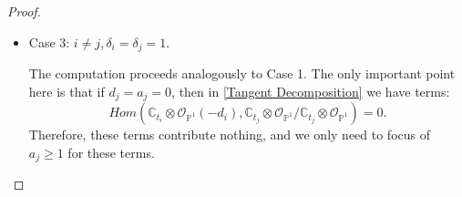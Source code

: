 \documentclass{amsart}
\begin{document}
\begin{proof}
\begin{itemize}
Consider the following short exact sequence: 
    \[0 \to \mathcal{O}_{\mathbb{P}^1}(-d_i) \to  \mathcal{O}_{\mathbb{P}^1} \to \mathcal{O}_{\mathbb{P}^1}/\mathcal{O}_{\mathbb{P}^1}(-d_i) \to 0.\]
    
    Applying the functor $Hom(\mathcal{O}_{\mathbb{P}^1}(-d_i),-)$, we obtain the exact sequence:
    \begin{align*}
   \scalebox{0.9}{$0 \to Hom(\mathcal{O}_{\mathbb{P}^1}(-d_i),\mathcal{O}_{\mathbb{P}^1}(-d_i)) \to  Hom(\mathcal{O}_{\mathbb{P}^1}(-d_i),\mathcal{O}_{\mathbb{P}^1}) \to Hom(\mathcal{O}_{\mathbb{P}^1}(-d_i), \mathcal{O}_{\mathbb{P}^1}/\mathcal{O}_{\mathbb{P}^1}(-d_i))   \to 0$}.
    \end{align*}
    As a vector space, we have the decomposition:
    \begin{align*}
    \scalebox{0.9}{$Hom(\mathcal{O}_{\mathbb{P}^1}(-d_i),\mathcal{O}_{\mathbb{P}^1}) = Hom(\mathcal{O}_{\mathbb{P}^1}(-d_i),\mathcal{O}_{\mathbb{P}^1}(-d_i)) \oplus Hom(\mathcal{O}_{\mathbb{P}^1}(-d_i), \mathcal{O}_{\mathbb{P}^1}/\mathcal{O}_{\mathbb{P}^1}(-d_i))$.}
    \end{align*}
    Note that
    \[
    Hom(\mathcal{O}_{\mathbb{P}^1}(-d_i),\mathcal{O}_{\mathbb{P}^1}(-d_i)) \cong H^0(\mathbb{P}^1,\mathcal{O}_{\mathbb{P}^1}) \cong \mathbb{C},
    \]
    which has weight 1. The weight decomposition of $Hom(\mathcal{O}_{\mathbb{P}^1}(-d_i),\mathcal{O}_{\mathbb{P}^1})$  is known from case 1, so the weights for $Hom(\mathcal{O}_{\mathbb{P}^1}(-d_i), \mathcal{O}_{\mathbb{P}^1}/\mathcal{O}_{\mathbb{P}^1}(-d_i))$ are given by $q^{-d_i+r}$, where $ 0 \leq r \leq d_i-1$. 

    \item Case 3: $i \ne j, \delta_i = \delta_j=1$.
    
     The computation proceeds analogously to Case 1. The only important point here is that if $d_j = a_j=0$, then in \eqref{Tangent Decomposition} we have terms:
     \[
     Hom(\mathbb{C}_{t_i} \otimes \mathcal{O}_{\mathbb{P}^1}(-d_i),\mathbb{C}_{t_j} \otimes\mathcal{O}_{\mathbb{P}^1} /\mathbb{C}_{t_j} \otimes \mathcal{O}_{\mathbb{P}^1}) = 0.
     \]
     Therefore, these terms contribute nothing, and we only need to focus of $a_j \geq 1$ for these terms.
    \end{itemize}
\end{proof}
\end{document}
